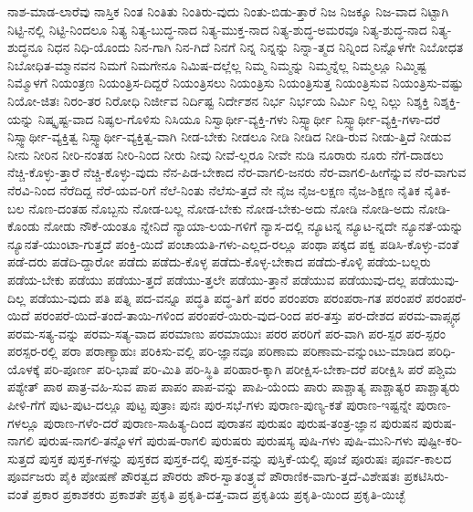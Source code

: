 {ನಾಶ-ಮಾಡ-ಲಾರೆವು
ನಾಸ್ತಿಕ
ನಿಂತ
ನಿಂತಿತು
ನಿಂತಿರು-ವುದು
ನಿಂತು-ಬಿಡು-ತ್ತಾರೆ
ನಿಜ
ನಿಜಕ್ಕೂ
ನಿಜ-ವಾದ
ನಿಟ್ಟಾಗಿ
ನಿಟ್ಟಿ-ನಲ್ಲಿ
ನಿಟ್ಟಿ-ನಿಂದಲೂ
ನಿತ್ಯ
ನಿತ್ಯ-ಬುದ್ಧ-ನಾದ
ನಿತ್ಯ-ಮುಕ್ತ-ನಾದ
ನಿತ್ಯ-ಶುದ್ಧ-ಅಮರವೂ
ನಿತ್ಯ-ಶುದ್ಧ-ನಾದ
ನಿತ್ಯ-ಶುದ್ಧನೂ
ನಿಧನ
ನಿಧಿ-ಯೊಂದು
ನಿನ-ಗಾಗಿ
ನಿನ-ಗಿದೆ
ನಿನಗೆ
ನಿನ್ನ
ನಿನ್ನನ್ನು
ನಿನ್ನಾ-ತ್ಮದ
ನಿನ್ನಿಂದ
ನಿನ್ನೊಳಗೇ
ನಿಬೋಧತ
ನಿಬೋಧಿತ-ಮ್ಮಾನವನ
ನಿಮಗೆ
ನಿಮಗೇನೂ
ನಿಮಿಷ-ದಲ್ಲೆಲ್ಲ
ನಿಮ್ಮ
ನಿಮ್ಮನ್ನು
ನಿಮ್ಮನ್ನೆಲ್ಲ
ನಿಮ್ಮಲ್ಲೂ
ನಿಮ್ಮಿಷ್ಟ
ನಿಮ್ಮೊಳಗೆ
ನಿಯಂತ್ರಣ
ನಿಯಂತ್ರಿಸ-ದಿದ್ದರೆ
ನಿಯಂತ್ರಿಸಲು
ನಿಯಂತ್ರಿಸು
ನಿಯಂತ್ರಿಸುತ್ತ
ನಿಯಂತ್ರಿಸುವ
ನಿಯಂತ್ರಿಸು-ವಷ್ಟು
ನಿಯೋ-ಜಿತಃ
ನಿರಂ-ತರ
ನಿರೋಧಿ
ನಿರ್ಜೀವ
ನಿರ್ದಿಷ್ಟ
ನಿರ್ದೇಶನ
ನಿರ್ಭ
ನಿರ್ಭಯ
ನಿರ್ಮಿ
ನಿಲ್ಲ
ನಿಲ್ಲು
ನಿಶ್ಶಕ್ತಿ
ನಿಶ್ಶಕ್ತಿ-ಯನ್ನು
ನಿಷ್ಕೃಷ್ಟ-ವಾದ
ನಿಷ್ಫಲ-ಗೊಳಿಸು
ನಿಸಿಯೂ
ನಿಸ್ವಾರ್ಥೀ-ವ್ಯಕ್ತಿ-ಗಳು
ನಿಸ್ಸ್ವಾರ್ಥೀ
ನಿಸ್ಸ್ವಾರ್ಥೀ-ವ್ಯಕ್ತಿ-ಗಳಾ-ದರೆ
ನಿಸ್ಸ್ವಾರ್ಥೀ-ವ್ಯಕ್ತಿತ್ವ
ನಿಸ್ಸ್ವಾರ್ಥೀ-ವ್ಯಕ್ತಿತ್ವ-ವಾಗಿ
ನೀಡ-ಬೇಕು
ನೀಡಲೂ
ನೀಡಿ
ನೀಡಿದ
ನೀಡಿ-ರುವ
ನೀಡು-ತ್ತಿದೆ
ನೀಡುವ
ನೀನು
ನೀರಿನ
ನೀರಿ-ನಂತಹ
ನೀರಿ-ನಿಂದ
ನೀರು
ನೀವು
ನೀವೆ-ಲ್ಲರೂ
ನೀವೇ
ನುಡಿ
ನೂರಾರು
ನೂರು
ನೆಗೆ-ದಾಡಲು
ನೆಚ್ಚಿ-ಕೊಳ್ಳು-ತ್ತಾರೆ
ನೆಚ್ಚಿ-ಕೊಳ್ಳು-ವುದು
ನೆನ-ಪಿಡ-ಬೇಕಾದ
ನೆರ-ವಾಗಲಿ-ಜನರು
ನೆರ-ವಾಗಲಿ-ಹೀಗೆನ್ನುವ
ನೆರ-ವಾಗುವ
ನೆರವಿ-ನಿಂದ
ನೆರೆದಿದ್ದ
ನೆರೆ-ಯವ-ರಿಗೆ
ನೆಲೆ-ನಿಂತು
ನೆಲೆಸು-ತ್ತದೆ
ನೇ
ನೈಜ
ನೈಜ-ಲಕ್ಷಣ
ನೈಜ-ಶಿಕ್ಷಣ
ನೈತಿಕ
ನೈತಿಕ-ಬಲ
ನೊಣ-ದಂತಹ
ನೊಬ್ಬನು
ನೋಡ-ಬಲ್ಲ
ನೋಡ-ಬೇಕು
ನೋಡ-ಬೇಕು-ಅದು
ನೋಡಿ
ನೋಡಿ-ಅದು
ನೋಡಿ-ಕೊಂಡು
ನೋಡು
ನೌಕೆ-ಯಂತೂ
ನ್ನೇನಿದೆ
ನ್ಯಾಯಾ-ಲಯ-ಗಳಿಗೆ
ನ್ಯಾಸ-ದಲ್ಲಿ
ನ್ಯೂಟನ್ನ
ನ್ಯೂಟ-ನ್ನದೇ
ನ್ಯೂನತೆ-ಯನ್ನು
ನ್ಯೂನತೆ-ಯುಂಟಾ-ಗುತ್ತದೆ
ಪಂಕ್ತಿ-ಯಿದೆ
ಪಂಚಾಯತಿ-ಗಳು-ಎಲ್ಲದ-ರಲ್ಲೂ
ಪಂಥಾ
ಪಕ್ಕದ
ಪಕ್ವ
ಪಡಿಸಿ-ಕೊಳ್ಳು-ವಂತೆ
ಪಡೆ-ದರು
ಪಡೆದಿ-ದ್ದಾರೋ
ಪಡೆದು
ಪಡೆದು-ಕೊಳ್ಳ
ಪಡೆದು-ಕೊಳ್ಳ-ಬೇಕಾದ
ಪಡೆದು-ಕೊಳ್ಳಿ
ಪಡೆಯ-ಬಲ್ಲರು
ಪಡೆಯ-ಬೇಕು
ಪಡೆಯು
ಪಡೆಯು-ತ್ತದೆ
ಪಡೆಯು-ತ್ತಲೇ
ಪಡೆಯು-ತ್ತಾನೆ
ಪಡೆಯುವ
ಪಡೆಯುವು-ದಲ್ಲ
ಪಡೆಯುವು-ದಿಲ್ಲ
ಪಡೆಯು-ವುದು
ಪತಿ
ಪತ್ನಿ
ಪದ-ವನ್ನೂ
ಪದ್ಧತಿ
ಪದ್ಧ-ತಿಗೆ
ಪರಂ
ಪರಂಪರಾ
ಪರಂಪರಾ-ಗತ
ಪರಂಪರೆ
ಪರಂಪರೆ-ಯಿದೆ
ಪರಂಪರೆ-ಯಿದೆ-ತಂದೆ-ತಾಯಿ-ಗಳಿಂದ
ಪರಂಪರೆ-ಯಿರು-ವುದ-ರಿಂದ
ಪರ-ತಸ್ತು
ಪರ-ದೇಶದ
ಪರಮ-ವಾಪ್ಸ್ಯಥ
ಪರಮ-ಸತ್ಯ-ವನ್ನು
ಪರಮ-ಸತ್ಯ-ವಾದ
ಪರಮಾಣು
ಪರಮಾಯುಃ
ಪರರ
ಪರರಿಗೆ
ಪರ-ವಾಗಿ
ಪರ-ಸ್ಪರ
ಪರ-ಸ್ಪರಂ
ಪರಸ್ಪರ-ರಲ್ಲಿ
ಪರಾ
ಪರಾಣ್ಯಾಹುಃ
ಪರಿಕಿಸು-ವಲ್ಲಿ
ಪರಿ-ಜ್ಞಾನವೂ
ಪರಿಣಾಮ
ಪರಿಣಾಮ-ವನ್ನುಂಟು-ಮಾಡಿದ
ಪರಿಧಿ-ಯೊಳಕ್ಕೆ
ಪರಿ-ಪೂರ್ಣ
ಪರಿ-ಭಾಷೆ
ಪರಿ-ಮಿತಿ
ಪರಿ-ಸ್ಥಿತಿ
ಪರಿಹಾರ-ಕ್ಕಾಗಿ
ಪರೀಕ್ಷಿಸ-ಬೇಕಾ-ದರೆ
ಪರೀಕ್ಷಿಸಿ
ಪರೆ
ಪಶ್ಚಿಮ
ಪಶ್ಯೇತ್
ಪಾಠ
ಪಾತ್ರ-ವಹಿ-ಸುವ
ಪಾಪ
ಪಾಪಂ
ಪಾಪ-ವನ್ನು
ಪಾಪಿ-ಯೆಂದು
ಪಾರು
ಪಾಶ್ಚಾತ್ಯ
ಪಾಶ್ಚಾತ್ಯರ
ಪಾಶ್ಚಾತ್ಯರು
ಪೀಳಿ-ಗೆಗೆ
ಪುಟ-ಪುಟ-ದಲ್ಲೂ
ಪುಟ್ಟ
ಪುತ್ರಾಃ
ಪುನಃ
ಪುರ-ಸಭೆ-ಗಳು
ಪುರಾಣ-ಪುಣ್ಯ-ಕತೆ
ಪುರಾಣ-ಇಷ್ಟನ್ನೇ
ಪುರಾಣ-ಗಳಲ್ಲೂ
ಪುರಾಣ-ಗಳೆಂ-ದರೆ
ಪುರಾಣ-ಸಾಹಿತ್ಯ-ದಿಂದ
ಪುರಾತನ
ಪುರುಷಂ
ಪುರುಷ-ತಂತ್ರ-ಜ್ಞಾನ
ಪುರುಷನ
ಪುರುಷ-ನಾಗಲಿ
ಪುರುಷ-ನಾಗಲಿ-ತನ್ನೊಳಗೆ
ಪುರುಷ-ರಾಗಲಿ
ಪುರುಷರು
ಪುರುಷಸ್ಯ
ಪುಷಿ-ಗಳು
ಪುಷಿ-ಮುನಿ-ಗಳು
ಪುಷ್ಟೀ-ಕರಿ-ಸುತ್ತದೆ
ಪುಸ್ತಕ
ಪುಸ್ತಕ-ಗಳನ್ನು
ಪುಸ್ತಕದ
ಪುಸ್ತಕ-ದಲ್ಲಿ
ಪುಸ್ತಕ-ವನ್ನು
ಪುಸ್ತಿಕೆ-ಯಲ್ಲಿ
ಪೂಜೆ
ಪೂರುಷಃ
ಪೂರ್ವ-ಕಾಲದ
ಪೂರ್ವಜರು
ಪೈಕಿ
ಪೋಷಣೆ
ಪೌರತ್ವದ
ಪೌರರು
ಪೌರ-ಸ್ವಾತಂತ್ರ್ಯವೆ
ಪೌರಾಣಿಕ-ವಾಗು-ತ್ತದೆ-ವಿಶೇಷತಃ
ಪ್ರಕಟಿಸಿರು-ವಂತೆ
ಪ್ರಕಾರ
ಪ್ರಕಾಶಕರು
ಪ್ರಕಾಶತೇ
ಪ್ರಕೃತಿ
ಪ್ರಕೃತಿ-ದತ್ತ-ವಾದ
ಪ್ರಕೃತಿಯ
ಪ್ರಕೃತಿ-ಯಿಂದ
ಪ್ರಕೃತಿ-ಯಿಚ್ಛೆ
}

